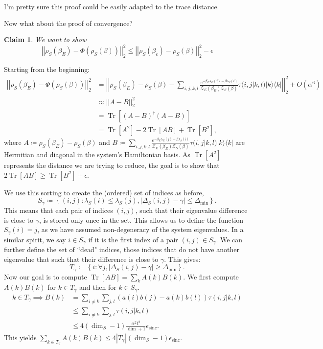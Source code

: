 \documentclass{article}
\newtheorem{claim}[theorem]{Claim}
\newcommand{\ketbra}[2]{| #1\rangle\! \langle #2|}
\newcommand{\brackets}[1]{\left[ #1 \right]}
\newcommand{\norm}[1]{\left| \left| #1 \right| \right|}
\newcommand{\set}[1]{\left\{ #1 \right\}}
\newcommand{\bigo}[1]{O\left( #1 \right)}
\DeclareMathOperator{\Tr}{Tr}
\newcommand{\trace}[1]{\Tr \brackets{ #1 }}
\newcommand{\partfun}{\mathcal{Z}}
\DeclareMathOperator{\sinc}{sinc}
\begin{document}
I'm pretty sure this proof could be easily adapted to the trace distance.

Now what about the proof of convergence?

\begin{claim}
We want to show
$$\norm{\rho_S(\beta_E) - \Phi(\rho_S(\beta))}_2^2 \leq \norm{\rho_S(\beta_e) - \rho_S(\beta)}_2^2 - \epsilon$$
\end{claim}

Starting from the beginning:
\begin{align}
    \norm{\rho_S(\beta_E) - \Phi(\rho_S(\beta))}_2^2 &= \norm{\rho_S(\beta_E) - \rho_S(\beta) - \sum_{i,j,k,l} \frac{e^{-\beta_E \lambda_E(j) - \beta \lambda_S(i)}}{\partfun_E(\beta_E) \partfun_S(\beta)} \tau(i,j|k,l) \ketbra{k}{k} }_2^2 + \bigo{\alpha^6} \\
    &\approx \norm{A - B}_2^2 \\
    &= \trace{(A - B)^\dagger (A - B)} \\
    &= \trace{A^2} - 2 \trace{A B} + \trace{B^2},
\end{align}
where $A \coloneqq \rho_S(\beta_E) - \rho_S(\beta)$ and $B \coloneqq \sum_{i,j,k,l} \frac{e^{-\beta_E \lambda_E(j) - \beta \lambda_S(i)}}{\partfun_E(\beta_E) \partfun_S(\beta)} \tau(i,j|k,l) \ketbra{k}{k} $ are Hermitian and diagonal in the system's Hamiltonian basis. As $\trace{A^2}$ represents the distance we are trying to reduce, the goal is to show that $2 \trace{AB} \geq \trace{B^2} + \epsilon$. 

We use this sorting to create the (ordered) set of indices as before,
\begin{equation}
    S_{\gamma} \coloneqq \set{(i,j) : \lambda_S(i) \leq \lambda_S(j), |\Delta_S(i,j) - \gamma| \leq \Delta_{\min}}.
\end{equation}
This means that each pair of indices $(i,j)$, such that their eigenvalue difference is close to $\gamma$, is stored only once in the set. This allows us to define the function $S_\gamma(i) = j$, as we have assumed non-degeneracy of the system eigenvalues. In a similar spirit, we say $i \in S_{\gamma}$ if it is the first index of a pair $(i,j) \in S_{\gamma}$. We can further define the set of ``dead" indices, those indices that do not have another eigenvalue that such that their difference is close to $\gamma$. This gives:
$$T_{\gamma} \coloneqq \set{i : \forall j, |\Delta_S(i,j) - \gamma| \geq \Delta_{\min}}.$$
Now our goal is to compute $\trace{A B} = \sum_{k} A(k) B(k)$. We first compute $A(k) B(k)$ for $k \in T_{\gamma}$ and then for $k \in S_{\gamma}$. 
\begin{align}
    k \in T_{\gamma} \implies B(k) &= \sum_{i \neq k} \sum_{j,l} (a(i) b(j) - a(k) b(l)) \tau(i,j|k,l) \\
    &\leq \sum_{i \neq k} \sum_{j,l} \tau(i,j|k,l) \\
    &\leq 4 (\dim_S - 1) \frac{\alpha^2 t^2}{\dim + 1}\epsilon_{\sinc}.
\end{align}
This yields $\sum_{k \in T_{\gamma}} A(k) B(k) \leq 4 |T_\gamma| (\dim_S - 1) \epsilon_{\sinc}$.
\end{document}
